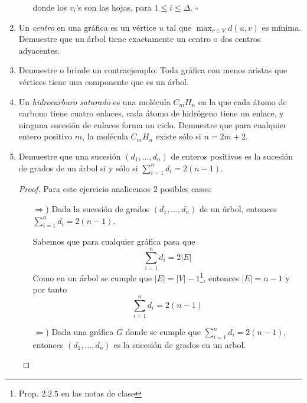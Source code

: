 \documentclass{article}
\begin{document}
\begin{enumerate}
\begin{enumerate}
      donde los $v_i$'s son las hojas, para $1 \leq i \leq \Delta$.
      \hfill $\square$
  \end{enumerate}
    
  \item Un {\em centro} en una gr\'afica es un v\'ertice
    $u$ tal que $\max_{v \in V} d(u, v)$ es m\'inima.
    Demuestre que un \'arbol tiene exactamente un centro
    o dos centros adyacentes.
    
  \item Demuestre o brinde un contraejemplo: Toda
    gr\'afica con menos aristas que v\'ertices tiene
    una componente que es un \'arbol.
    
  \item Un {\em hidrocarburo saturado} es una
    mol\'ecula $C_mH_n$ en la que cada \'atomo de
    carbono tiene cuatro enlaces, cada
    \'atomo de hidr\'ogeno tiene un enlace, y
    ninguna sucesi\'on de enlaces forma un ciclo.
    Demuestre que para cualquier entero positivo
    $m$, la mol\'ecula $C_mH_n$ existe s\'olo si
    $n = 2m + 2$.
    
  \item Demuestre que una sucesi\'on $(d_1, \dots,
    d_n)$ de enteros positivos es la sucesi\'on de
    grados de un \'arbol si y s\'olo si
    $\sum_{i=1}^n d_i = 2(n-1)$.
    \renewcommand\qedsymbol{QED}
    \begin{proof}
      Para este ejercicio analicemos $2$ posibles casos:
      \begin{itemize}
      \item[$\Rightarrow$)] Dada la sucesi\'on de grados $(d_1, \dots, d_n)$ de un
        \'arbol, entonces $\sum_{i=1}^n d_i = 2(n-1)$.
        
        Sabemos que para cualquier gr\'afica pasa que
        \[
        \sum_{i=1}^n d_i = 2|E|
        \]
        Como en un \'arbol se cumple que $|E| = |V| - 1$\footnote{Prop. $2.2.5$ en las
          notas de clase}, entonces $|E| = n - 1$ y por tanto
        \[
        \sum_{i=1}^n d_i = 2(n - 1)
        \]
        
      \item[$\Leftarrow$)] Dada una gr\'afica $G$ donde se cumple que
        $\sum_{i=1}^n d_i = 2(n-1)$, entonces $(d_1, \dots, d_n)$ es la
        sucesi\'on de grados en un arbol.
        

\end{itemize}
\end{proof}
\end{enumerate}
\end{document}
